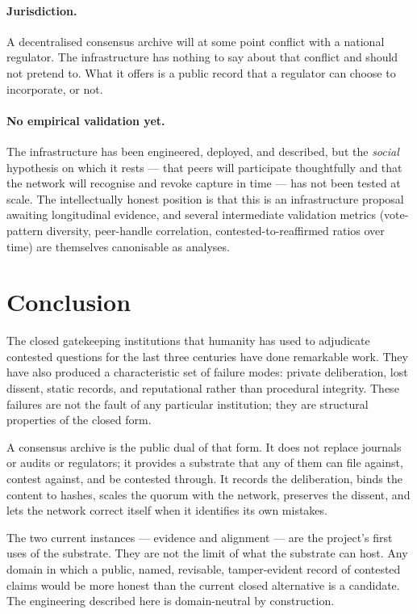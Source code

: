 \documentclass[11pt,a4paper]{article}
\begin{document}
\paragraph{Jurisdiction.} A decentralised consensus archive
will at some point conflict with a national regulator. The
infrastructure has nothing to say about that conflict and
should not pretend to. What it offers is a public record that
a regulator can choose to incorporate, or not.

\paragraph{No empirical validation yet.} The infrastructure
has been engineered, deployed, and described, but the
\emph{social} hypothesis on which it rests --- that peers will
participate thoughtfully and that the network will recognise
and revoke capture in time --- has not been tested at scale.
The intellectually honest position is that this is an
infrastructure proposal awaiting longitudinal evidence, and
several intermediate validation metrics (vote-pattern
diversity, peer-handle correlation, contested-to-reaffirmed
ratios over time) are themselves canonisable as analyses.

\section{Conclusion}

The closed gatekeeping institutions that humanity has used to
adjudicate contested questions for the last three centuries
have done remarkable work. They have also produced a
characteristic set of failure modes: private deliberation, lost
dissent, static records, and reputational rather than
procedural integrity. These failures are not the fault of any
particular institution; they are structural properties of the
closed form.

A consensus archive is the public dual of that form. It does
not replace journals or audits or regulators; it provides a
substrate that any of them can file against, contest against,
and be contested through. It records the deliberation, binds
the content to hashes, scales the quorum with the network,
preserves the dissent, and lets the network correct itself when
it identifies its own mistakes.

The two current instances --- evidence and alignment --- are
the project's first uses of the substrate. They are not the
limit of what the substrate can host. Any domain in which a
public, named, revisable, tamper-evident record of contested
claims would be more honest than the current closed
alternative is a candidate. The engineering described here is
domain-neutral by construction.
\end{document}

